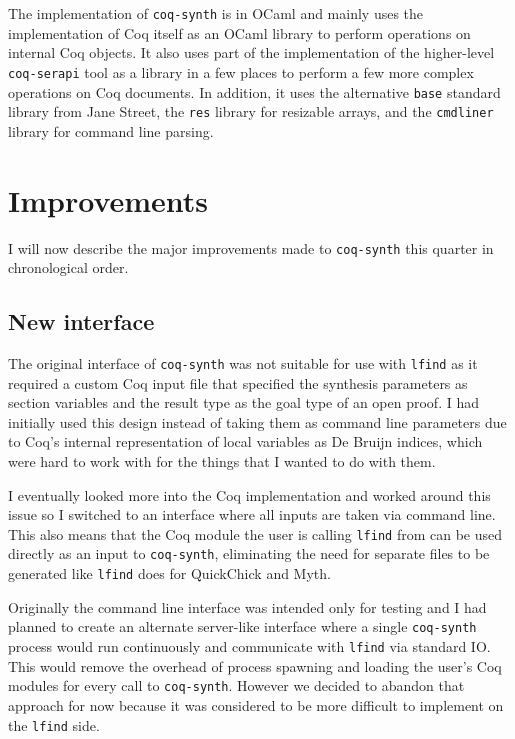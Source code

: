 \documentclass[11pt]{article}
\begin{document}
The implementation of \texttt{coq-synth} is in OCaml and mainly uses the implementation of Coq itself as an OCaml library to perform operations on internal Coq objects. It also uses part of the implementation of the higher-level \texttt{coq-serapi} tool as a library in a few places to perform a few more complex operations on Coq documents. In addition, it uses the alternative \texttt{base} standard library from Jane Street, the \texttt{res} library for resizable arrays, and the \texttt{cmdliner} library for command line parsing.

\section{Improvements}

I will now describe the major improvements made to \texttt{coq-synth} this quarter in chronological order.

\subsection{New interface}

The original interface of \texttt{coq-synth} was not suitable for use with \texttt{lfind} as it required a custom Coq input file that specified the synthesis parameters as section variables and the result type as the goal type of an open proof. I had initially used this design instead of taking them as command line parameters due to Coq's internal representation of local variables as De Bruijn indices, which were hard to work with for the things that I wanted to do with them.

I eventually looked more into the Coq implementation and worked around this issue so I switched to an interface where all inputs are taken via command line. This also means that the Coq module the user is calling \texttt{lfind} from can be used directly as an input to \texttt{coq-synth}, eliminating the need for separate files to be generated like \texttt{lfind} does for QuickChick and Myth.

Originally the command line interface was intended only for testing and I had planned to create an alternate server-like interface where a single \texttt{coq-synth} process would run continuously and communicate with \texttt{lfind} via standard IO. This would remove the overhead of process spawning and loading the user's Coq modules for every call to \texttt{coq-synth}. However we decided to abandon that approach for now because it was considered to be more difficult to implement on the \texttt{lfind} side.
\end{document}
